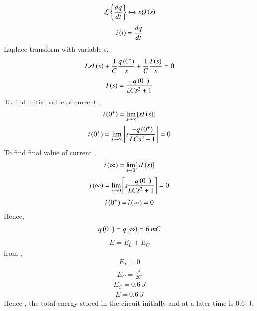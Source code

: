 \documentclass[beamer]{IEEEtran}
\theoremstyle{remark}
\begin{document}
\begin{align}
\mathcal{L} \left\{\frac{dq}{dt}\right\}\xleftrightarrow{} sQ\left(s\right)
\end{align}
\begin{align}
 i\left(t\right)=\frac{dq}{dt}
\end{align}
Laplace transform with variable s,
\begin{align}
    L{sI\left(s\right)}+\frac{1}{C}\frac{q\left(0^{+}\right)}{s}+\frac{1}{C}\frac{I\left(s\right)}{s}=0
\end{align}
\begin{align}
    I\left(s\right)= \frac{-q\left(0^{+}\right)}{LCs^2+1}
\end{align}
\vspace{10pt}
To find initial value of current ,
\begin{align}
    i\left(0^{+}\right)=\lim_{s\to\infty}[sI\left(s\right)]
\end{align}
\begin{align}
    i\left(0^{+}\right)=\lim_{s\to\infty}\left[s\frac{-q\left(0^{+}\right)}{LCs^2+1}\right]=0
\end{align}
\vspace{10pt}
To find final value of current ,
\begin{align}
     i\left(\infty\right)=\lim_{s\to0}[sI\left(s\right)]
\end{align}
\begin{align}
   i\left(\infty\right)=\lim_{s\to0}\left[s\frac{-q\left(0^{+}\right)}{LCs^2+1}\right]=0 
\end{align}
\begin{align}
    i\left(0^{+}\right)=i\left(\infty\right)=0
\end{align}
Hence,
\begin{align}
    q\left(0^{+}\right)=q\left(\infty\right)=6\ mC
\end{align}
\begin{align}
    E=E_L+E_C
\end{align}
from ,
\begin{align}
    E_L=0
\end{align}
\begin{align}
    E_C=\frac{q^2}{2C}
\end{align}
\begin{align}
    E_C=0.6\ J
\end{align}
\begin{align}
    E=0.6\ J
\end{align}
Hence , the total energy stored in the circuit initially and at a later time is 0.6\ J.
\end{document}
